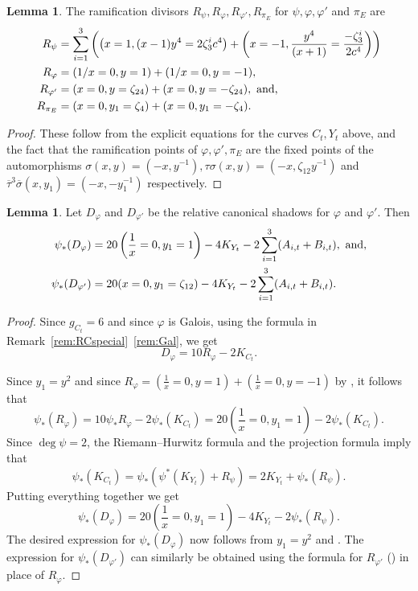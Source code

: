 \documentclass[reqno,10pt]{amsart}
\theoremstyle{definition}
\theoremstyle{definition}
\newtheorem{lem}[thm]{Lemma}
\begin{document}
\begin{lem}\label{lem:branchppoints}
The ramification divisors $R_{\psi}, R_{\varphi}, R_{\varphi'}, R_{\pi_{E}}$ for   $\psi, \varphi, \varphi'$ and $\pi_E$ are
\begin{align*} 
R_{\psi} &= \sum_{i=1}^3 \left( \left(x=1,(x-1)y^4=2\zeta_3^i c^4 \right) + \left(x=-1,\frac{y^4}{(x+1)}=\frac{-\zeta_3^i}{2c^4} \right) \right)
\\
R_{\varphi} &= (1/x=0, y=1) + (1/x=0,y=-1), \\
R_{\varphi'} &= (x=0, y=\zeta_{24}) + (x=0,y=-\zeta_{24}), \textup{ and,} \\
R_{\pi_{E}} &= (x = 0, y_1 = \zeta_{4}) + (x = 0, y_1 = - \zeta_{4}).
\end{align*}

\end{lem}
\begin{proof}
These follow from the explicit equations for the curves $C_t,Y_t$ above, and the fact that the ramification points of $\varphi,\varphi', \pi_E$ are the fixed points of the automorphisms $\sigma(x,y) =(-x,y^{-1}), \tau \sigma(x,y) = (-x,\zeta_{12}y^{-1})$ and $\overline{\tau}^3 \overline{\sigma}(x,y_1) = (-x,-y_1^{-1})$ respectively. 
\end{proof}

\begin{lem}\label{lem:Ctrelcanonicalshadow}
Let $D_{\varphi}$ and $D_{\varphi'}$ be the relative canonical shadows for $\varphi$ and $\varphi'$.
Then
\begin{align*}\psi_*(D_\varphi) &= 20 \left(\frac{1}{x}=0,y_1=1 \right)-4K_{Y_t}-2\sum_{i=1}^3 (A_{i,t}+B_{i,t}), \textup{\  and,}\\
\psi_{*}(D_{\varphi'}) &= 20(x=0, y_1=\zeta_{12})-4K_{Y_t}-2\sum_{i=1}^3 (A_{i,t}+B_{i,t}).\end{align*}

\end{lem}
\begin{proof}
Since $g_{C_t}=6$ and since $\varphi$ is Galois, using the formula in Remark~\ref{rem:RCspecial}~\eqref{rem:Gal}, we get
\[D_{\varphi}=10 R_{\varphi}-2K_{C_t}.\]

Since $y_1 = y^2$ and since $R_{\varphi} = (\frac{1}{x}=0, y=1) + (\frac{1}{x}=0, y=-1)$ by , it follows that \[\psi_{*}(R_{\varphi}) = 10 \psi_{*} R_{\varphi}-2 \psi_{*}(K_{C_t}) = 20 \left(\frac{1}{x}=0, y_1=1 \right) -2 \psi_{*}(K_{C_t}).\] Since $\deg \psi = 2$, the Riemann--Hurwitz formula and the projection formula imply that  
\[ \psi_*(K_{C_t}) = \psi_*(\psi^*(K_{Y_t}) + R_{\psi}) = 2K_{Y_t} + \psi_*(R_{\psi}).\]  Putting everything together we get
$$\psi_*(D_{\varphi}) = 20 \left(\frac{1}{x}=0, y_1=1 \right) - 4K_{Y_t} - 2\psi_*(R_{\psi}).$$
The desired expression for $\psi_*(D_{\varphi})$ now follows from $y_1=y^2$ and . The expression for $\psi_{*}(D_{\varphi'})$  can similarly be obtained using the formula for $R_{\varphi'}$ () in place of $R_{\varphi}$.
\end{proof}
\end{document}
